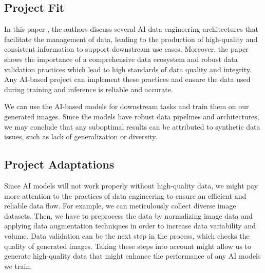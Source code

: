 \documentclass[11pt]{article}
\begin{document}
 \subsection{Project Fit} 

In this paper \cite{heck2024data}, the authors discuss several AI data engineering architectures that facilitate the management of data, leading to the production of high-quality and consistent information to support downstream use cases. Moreover, the paper shows the importance of a comprehensive data ecosystem and robust data validation practices which lead to high standards of data quality and integrity. Any AI-based project can implement these practices and ensure the data used during training and inference is reliable and accurate.

We can use the AI-based models for downstream tasks and train them on our generated images. Since the models have robust data pipelines and architectures, we may conclude that any suboptimal results can be attributed to synthetic data issues, such as lack of generalization or diversity.



 \subsection{Project Adaptations} 


Since AI models will not work properly without high-quality data, we might pay more attention to the practices of data engineering to ensure an efficient and reliable data flow. For example, we can meticulously collect diverse image datasets. Then, we have to preprocess the data by normalizing image data and applying data augmentation techniques in order to increase data variability and volume. Data validation can be the next step in the process, which checks the quality of generated images. Taking these steps into account might allow us to generate high-quality data that might enhance the performance of any AI models we train.







  




\end{document}
